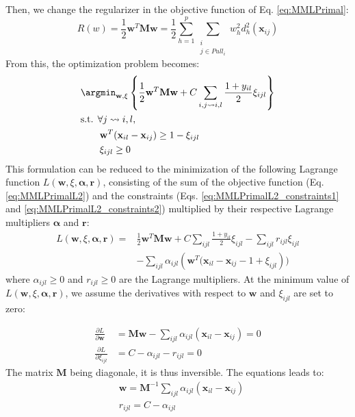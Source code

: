 \noindent Then, we change the regularizer in the objective function of Eq. \ref{eq:MMLPrimal}:
\begin{equation}
	R(w) = \frac{1}{2} \textbf{w}^T \textbf{M} \textbf{w} = \frac{1}{2} \sum\limits_{h=1}^{p} \sum\limits_{\substack{i \\ j \in Pull_i}} w_h^2 d_h^2(\textbf{x}_{ij})
\end{equation}
\noindent From this, the optimization problem becomes:
\begin{align}
	&\displaystyle 		\argmin_{\textbf{w},\xi}
	\left\lbrace \frac{1}{2} \textbf{w}^T \textbf{M} \textbf{w}					
	+					
	C\sum\limits_{i,j \rightsquigarrow i,l} \frac{1+y_{il}}{2} \xi_{ijl}
	\right\rbrace  \label{eq:MMLPrimalL2} \\
	&\text{s.t.  } \forall j \rightsquigarrow i, l, \nonumber \\
	& \qquad \textbf{w}^T(\textbf{x}_{il}-\textbf{x}_{ij}) \geq 1-\xi_{ijl} \label{eq:MMLPrimalL2_constraints1} \\
	& \qquad \xi_{ijl} \geq 0 \label{eq:MMLPrimalL2_constraints2}
\end{align}
This formulation can be reduced to the minimization of the following Lagrange function $L(\textbf{w},\xi,\boldsymbol{\alpha},\textbf{r})$, consisting of the sum of the objective function (Eq. \ref{eq:MMLPrimalL2}) and the constraints (Eqs. \ref{eq:MMLPrimalL2_constraints1} and \ref{eq:MMLPrimalL2_constraints2}) multiplied by their respective Lagrange multipliers $\boldsymbol{\alpha}$ and $\textbf{r}$:
\begin{equation}
\begin{aligned}
	L(\textbf{w},\xi,\boldsymbol{\alpha},\textbf{r}) 
	= & 
	\frac{1}{2} \textbf{w}^T \textbf{M} \textbf{w}
	+ C \sum\limits_{ijl} \frac{1+y_{il}}{2} \xi_{ijl} - \sum\limits_{ijl}r_{ijl} \xi_{ijl} \\
	&  - \sum\limits_{ijl} \alpha_{ijl}\left( \textbf{w}^T(\textbf{x}_{il}-\textbf{x}_{ij}-1+\xi_{ijl} \right))
	\label{eq:OptimizationDual}
\end{aligned}
\end{equation}
\noindent where $\alpha_{ijl} \geq 0$ and $r_{ijl} \geq 0$ are the Lagrange multipliers. At the minimum value of $L(\textbf{w},\xi,\boldsymbol{\alpha},\textbf{r})$, we assume the derivatives with respect to $\textbf{w}$ and $\xi_{ijl}$ are set to zero:

\begin{align*}
\frac{\partial L}{\partial \textbf{w}} 
& = 
\textbf{M} \textbf{w} 
- \sum\limits_{ijl} \alpha_{ijl}(\textbf{x}_{il}-\textbf{x}_{ij}) 
= 0 \\
\frac{\partial L}{\partial \xi_{ijl}} & = C - \alpha_{ijl} - r_{ijl} = 0
\end{align*}
\noindent The matrix $\textbf{M}$ being diagonale, it is thus inversible. The equations leads to:
\begin{align}
& \textbf{w} = \textbf{M}^{-1}  
\sum\limits_{ijl} \alpha_{ijl}(\textbf{x}_{il}-\textbf{x}_{ij}) \label{Eq:eqn_w} 
\\ 
& r_{ijl} = C - \alpha_{ijl} \label{Eq:eqn_w2}
\end{align}

